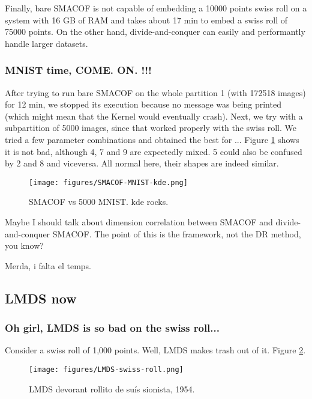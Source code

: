 Finally, bare SMACOF is not capable of embedding a 10000 points swiss roll on a system with 16 GB of RAM and takes about 17 min to embed a swiss roll of 75000 points. On the other hand, divide-and-conquer can easily and performantly handle larger datasets.

\subsubsection{MNIST time, COME. ON. !!!}

After trying to run bare SMACOF on the whole partition 1 (with 172518 images) for 12 min, we stopped its execution because no message was being printed (which might mean that the Kernel would eventually crash). Next, we try with a subpartition of 5000 images, since that worked properly with the swiss roll. We tried a few parameter combinations and obtained the best for ... Figure \ref{fig:SMACOF-MNIST-kde} shows it is not bad, although 4, 7 and 9 are expectedly mixed. 5 could also be confused by 2 and 8 and viceversa. All normal here, their shapes are indeed similar.

\begin{figure}[ht]
    \centering
    \texttt{[image: figures/SMACOF-MNIST-kde.png]}
    \caption{SMACOF vs 5000 MNIST. kde rocks.}
    \label{fig:SMACOF-MNIST-kde}
\end{figure}

Maybe I should talk about dimension correlation between SMACOF and divide-and-conquer SMACOF. The point of this is the framework, not the DR method, you know?

Merda, i falta el temps.


\subsection{LMDS now}

\subsubsection{Oh girl, LMDS is so bad on the swiss roll...}

Consider a swiss roll of 1,000 points. Well, LMDS makes trash out of it. Figure \ref{fig:LMDS-swiss-roll}.

\begin{figure}[ht]
    \centering
    \texttt{[image: figures/LMDS-swiss-roll.png]}
    \caption{LMDS devorant rollito de suís sionista, 1954.}
    \label{fig:LMDS-swiss-roll}
\end{figure}

